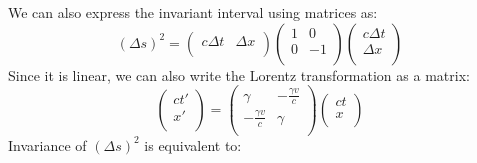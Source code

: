 \documentclass[../main.tex]{subfiles}
\begin{document}
We can also express the invariant interval using matrices as:
\[
  (\Delta s)^2 = \begin{pmatrix}
  c \Delta t & \Delta x \\
  \end{pmatrix} \begin{pmatrix}
  1 & 0 \\
  0 & -1 \\
  \end{pmatrix} \begin{pmatrix}
  c \Delta t \\
  \Delta x \\
  \end{pmatrix}
\]
Since it is linear, we can also write the Lorentz transformation as a matrix:
\[
  \begin{pmatrix}
  c t' \\
  x' \\
  \end{pmatrix} = \begin{pmatrix}
  \gamma & - \frac{\gamma v}{c} \\
  - \frac{\gamma v}{c} & \gamma \\
  \end{pmatrix} \begin{pmatrix}
  ct \\
  x \\
  \end{pmatrix}
\]
Invariance of $(\Delta s)^2$ is equivalent to:
\end{document}
